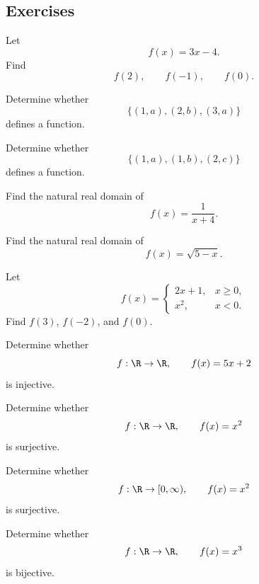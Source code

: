 \subsection{Exercises}
\label{subsec:functions-exercises}

\begin{exercise}[1]
Let
\[ f(x)=3x-4. \]
Find
\[ f(2),\qquad f(-1),\qquad f(0). \]
\end{exercise}

\begin{exercise}[1]
Determine whether
\[ \{(1,a),(2,b),(3,a)\} \]
defines a function.
\end{exercise}

\begin{exercise}[1]
Determine whether
\[ \{(1,a),(1,b),(2,c)\} \]
defines a function.
\end{exercise}

\begin{exercise}[1]
Find the natural real domain of
\[ f(x)=\frac1{x+4}. \]
\end{exercise}

\begin{exercise}[1]
Find the natural real domain of
\[ f(x)=\sqrt{5-x}. \]
\end{exercise}

\begin{exercise}[1]
Let
\[ f(x)=
\begin{cases}
2x+1,&x\geq0,\\
x^2,&x<0.
\end{cases}
\]
Find \(f(3)\), \(f(-2)\), and \(f(0)\).
\end{exercise}

\begin{exercise}[2]
Determine whether
\[ f:\R\to\R,\qquad f(x)=5x+2 \]
is injective.
\end{exercise}

\begin{exercise}[2]
Determine whether
\[ f:\R\to\R,\qquad f(x)=x^2 \]
is surjective.
\end{exercise}

\begin{exercise}[2]
Determine whether
\[ f:\R\to[0,\infty),\qquad f(x)=x^2 \]
is surjective.
\end{exercise}

\begin{exercise}[2]
Determine whether
\[ f:\R\to\R,\qquad f(x)=x^3 \]
is bijective.
\end{exercise}

